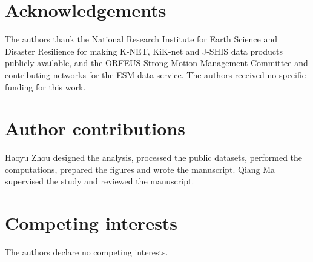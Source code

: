\documentclass[11pt]{article}
\begin{document}
\section*{Acknowledgements}

The authors thank the National Research Institute for Earth Science and Disaster Resilience for making K-NET, KiK-net and J-SHIS data products publicly available, and the ORFEUS Strong-Motion Management Committee and contributing networks for the ESM data service. The authors received no specific funding for this work.

\section*{Author contributions}

Haoyu Zhou designed the analysis, processed the public datasets, performed the computations, prepared the figures and wrote the manuscript. Qiang Ma supervised the study and reviewed the manuscript.

\section*{Competing interests}

The authors declare no competing interests.
\end{document}
